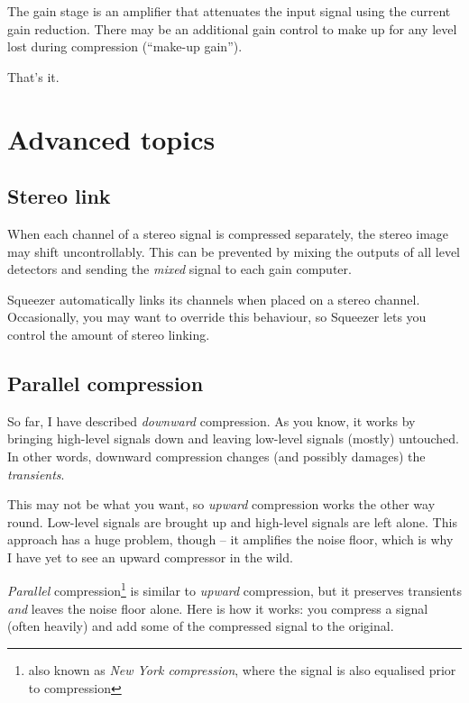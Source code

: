 The gain stage is an amplifier that attenuates the input signal using
the current gain reduction.  There may be an additional gain control
to make up for any level lost during compression (``make-up gain'').

That's it.

\section{Advanced topics}
\label{sec:advanced_topics}

\subsection{Stereo link}
\label{sec:stereo_link}

When each channel of a stereo signal is compressed separately, the
stereo image may shift uncontrollably.  This can be prevented by
mixing the outputs of all level detectors and sending the \emph{mixed}
signal to each gain computer.

Squeezer automatically links its channels when placed on a stereo
channel.  Occasionally, you may want to override this behaviour, so
Squeezer lets you control the amount of stereo linking.

\subsection{Parallel compression}
\label{sec:parallel_compression}

So far, I have described \emph{downward} compression.  As you know, it
works by bringing high-level signals down and leaving low-level
signals (mostly) untouched.  In other words, downward compression
changes (and possibly damages) the \emph{transients}.

This may not be what you want, so \emph{upward} compression works the
other way round.  Low-level signals are brought up and high-level
signals are left alone.  This approach has a huge problem, though --
it amplifies the noise floor, which is why I have yet to see an upward
compressor in the wild.

\emph{Parallel} compression\footnote{also known as \emph{New York
    compression}, where the signal is also equalised prior to
  compression} is similar to \emph{upward} compression, but it
preserves transients \emph{and} leaves the noise floor alone.  Here is
how it works: you compress a signal (often heavily) and add some of
the compressed signal to the original.

